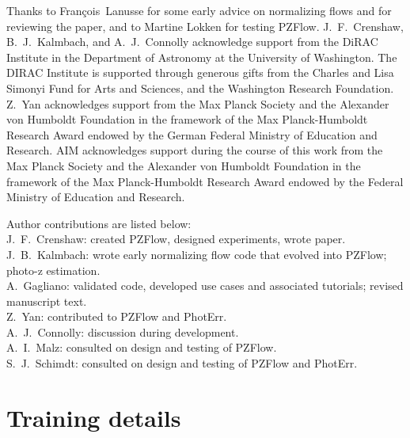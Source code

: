 \documentclass[twocolumn,twocolappendix,linenumbers]{aastex631}
\begin{document}
\begin{acknowledgements}
    Thanks to François~Lanusse for some early advice on normalizing flows and for reviewing the paper, and to Martine Lokken for testing PZFlow.
    J.~F.~Crenshaw, B.~J.~Kalmbach, and A.~J.~Connolly acknowledge support from the DiRAC Institute in the Department of Astronomy at the University of Washington.
    The DIRAC Institute is supported through generous gifts from the Charles and Lisa Simonyi Fund for Arts and Sciences, and the Washington Research Foundation.
    Z.~Yan acknowledges support from the Max Planck Society and the Alexander von Humboldt Foundation in the framework of the Max Planck-Humboldt Research Award endowed by the German Federal Ministry of Education and Research.
    AIM acknowledges support during the course of this work from the Max Planck Society and the Alexander von Humboldt Foundation in the framework of the Max Planck-Humboldt Research Award endowed by the Federal Ministry of Education and Research.

    Author contributions are listed below: \\
    J.~F.~Crenshaw: created PZFlow, designed experiments, wrote paper. \\
    J.~B.~Kalmbach: wrote early normalizing flow code that evolved into PZFlow; photo-z estimation. \\
    A.~Gagliano: validated code, developed use cases and associated tutorials; revised manuscript text. \\
    Z.~Yan: contributed to PZFlow and PhotErr. \\
    A.~J.~Connolly: discussion during development. \\
    A.~I.~Malz: consulted on design and testing of PZFlow. \\
    S.~J.~Schimdt: consulted on design and testing of PZFlow and PhotErr. \\
\end{acknowledgements}


\appendix

\section{Training details}
\label{app:training-details}
\end{document}

